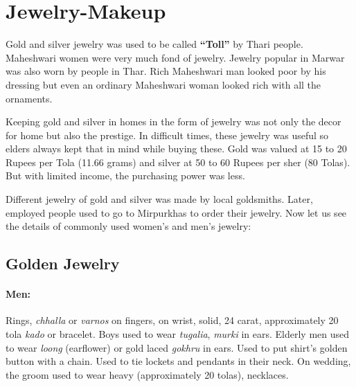 \section{Jewelry-Makeup} Gold and silver jewelry was used to be called \textbf{``Toll''} by Thari people. Maheshwari women were very much fond of jewelry. Jewelry popular in Marwar was also worn by people in Thar. Rich Maheshwari man looked poor by his dressing but even an ordinary Maheshwari woman looked rich with all the ornaments.

Keeping gold and silver in homes in the form of jewelry was not only the decor for home but also the prestige. In difficult times, these jewelry was useful so elders always kept that in mind while buying these. Gold was valued at 15 to 20 Rupees per Tola (11.66 grams) and silver at 50 to 60 Rupees per sher (80 Tolas). But with limited income, the purchasing power was less.

Different jewelry of gold and silver was made by local goldsmiths. Later, employed people used to go to Mirpurkhas to order their jewelry. Now let us see the details of commonly used women's and men's jewelry:
\subsection{Golden Jewelry}
\paragraph{Men:} Rings, \textit{chhalla} or \textit{varnos} on fingers, on wrist, solid, 24 carat, approximately 20 tola \textit{kado} or bracelet. Boys used to wear \textit{tugalia}, \textit{murki} in ears. Elderly men used to wear \textit{loong} (earflower) or gold laced \textit{gokhru} in ears. Used to put shirt's golden button with a chain. Used to tie lockets and pendants in their neck. On wedding, the groom used to wear heavy (approximately 20 tolas), necklaces.
